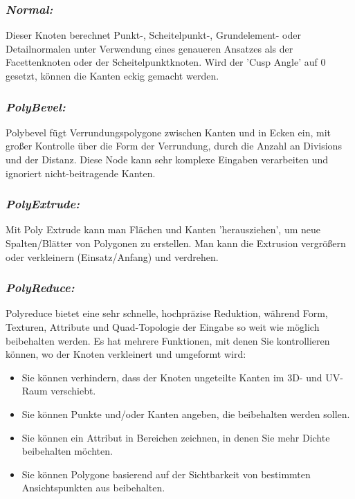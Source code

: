\documentclass[paper=a4,fontsize=12pt,ngerman]{scrartcl}
\begin{document}
	\subsubsection*{\textit{Normal:}}
	Dieser Knoten berechnet Punkt-, Scheitelpunkt-, Grundelement- oder Detailnormalen unter Verwendung eines genaueren Ansatzes als der Facettenknoten oder der Scheitelpunktknoten. Wird der 'Cusp Angle' auf 0 gesetzt, können die Kanten eckig gemacht werden.
	\subsubsection*{\textit{PolyBevel:}}
	Polybevel fügt Verrundungspolygone zwischen Kanten und in Ecken ein, mit großer Kontrolle über die Form der Verrundung, durch die Anzahl an Divisions und der Distanz. Diese Node kann sehr komplexe Eingaben verarbeiten und ignoriert nicht-beitragende Kanten.
	\subsubsection*{\textit{PolyExtrude:}}
	Mit Poly Extrude kann man Flächen und Kanten 'herausziehen', um neue Spalten/Blätter von Polygonen zu erstellen. Man kann die Extrusion vergrößern oder verkleinern (Einsatz/Anfang) und verdrehen. 
	\subsubsection*{\textit{PolyReduce:}}
	Polyreduce bietet eine sehr schnelle, hochpräzise Reduktion, während Form, Texturen, Attribute und Quad-Topologie der Eingabe so weit wie möglich beibehalten werden. Es hat mehrere Funktionen, mit denen Sie kontrollieren können, wo der Knoten verkleinert und umgeformt wird:
	\begin{itemize}
		\item Sie können verhindern, dass der Knoten ungeteilte Kanten im 3D- und UV- Raum verschiebt.
		\item Sie können Punkte und/oder Kanten angeben, die beibehalten werden sollen. 
		\item Sie können ein Attribut in Bereichen zeichnen, in denen Sie mehr Dichte beibehalten möchten. 
		\item Sie können Polygone basierend auf der Sichtbarkeit von bestimmten Ansichtspunkten aus beibehalten. 
	\end{itemize}
\end{document}
